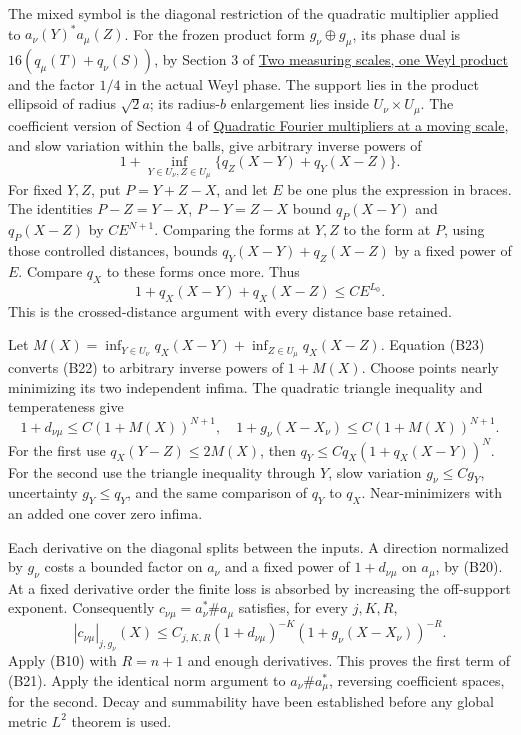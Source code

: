 \documentclass[
  11pt,
]{article}
\begin{document}
The mixed symbol is the diagonal restriction of the quadratic multiplier
applied to \(a_\nu(Y)^*a_\mu(Z)\). For the frozen product form
\(g_\nu\oplus g_\mu\), its phase dual is \(16(q_\mu(T)+q_\nu(S))\), by
Section 3 of \href{weyl-metric-products.pdf}{Two measuring scales, one
Weyl product} and the factor \(1/4\) in the actual Weyl phase. The
support lies in the product ellipsoid of radius \(\sqrt2a\); its
radius-\(b\) enlargement lies inside \(U_\nu\times U_\mu\). The
coefficient version of Section 4 of
\href{gauss-transform-estimates.pdf}{Quadratic Fourier multipliers at a
moving scale}, and slow variation within the balls, give arbitrary
inverse powers of \[
 1+\inf_{Y\in U_\nu,Z\in U_\mu}
       \{q_Z(X-Y)+q_Y(X-Z)\}.
 \tag{B22}
\] For fixed \(Y,Z\), put \(P=Y+Z-X\), and let \(E\) be one plus the
expression in braces. The identities \(P-Z=Y-X\), \(P-Y=Z-X\) bound
\(q_P(X-Y)\) and \(q_P(X-Z)\) by \(CE^{N+1}\). Comparing the forms at
\(Y,Z\) to the form at \(P\), using those controlled distances, bounds
\(q_Y(X-Y)+q_Z(X-Z)\) by a fixed power of \(E\). Compare \(q_X\) to
these forms once more. Thus \[
 1+q_X(X-Y)+q_X(X-Z)\le CE^{L_0}.
 \tag{B23}
\] This is the crossed-distance argument with every distance base
retained.

Let \(M(X)=\inf_{Y\in U_\nu}q_X(X-Y)+\inf_{Z\in U_\mu}q_X(X-Z)\).
Equation (B23) converts (B22) to arbitrary inverse powers of \(1+M(X)\).
Choose points nearly minimizing its two independent infima. The
quadratic triangle inequality and temperateness give \[
 1+d_{\nu\mu}\le C(1+M(X))^{N+1},
 \quad 1+g_\nu(X-X_\nu)\le C(1+M(X))^{N+1}.
 \tag{B24}
\] For the first use \(q_X(Y-Z)\le2M(X)\), then
\(q_Y\le Cq_X(1+q_X(X-Y))^N\). For the second use the triangle
inequality through \(Y\), slow variation \(g_\nu\le Cg_Y\), uncertainty
\(g_Y\le q_Y\), and the same comparison of \(q_Y\) to \(q_X\).
Near-minimizers with an added one cover zero infima.

Each derivative on the diagonal splits between the inputs. A direction
normalized by \(g_\nu\) costs a bounded factor on \(a_\nu\) and a fixed
power of \(1+d_{\nu\mu}\) on \(a_\mu\), by (B20). At a fixed derivative
order the finite loss is absorbed by increasing the off-support
exponent. Consequently \(c_{\nu\mu}=a_\nu^*\#a_\mu\) satisfies, for
every \(j,K,R\), \[
 |c_{\nu\mu}|_{j,g_\nu}(X)
 \le C_{j,K,R}(1+d_{\nu\mu})^{-K}
       (1+g_\nu(X-X_\nu))^{-R}.
 \tag{B25}
\] Apply (B10) with \(R=n+1\) and enough derivatives. This proves the
first term of (B21). Apply the identical norm argument to
\(a_\nu\#a_\mu^*\), reversing coefficient spaces, for the second. Decay
and summability have been established before any global metric \(L^2\)
theorem is used.
\end{document}

